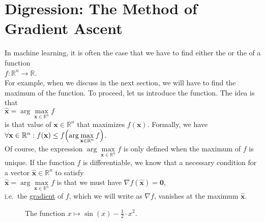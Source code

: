 \section{Digression: The Method of Gradient Ascent \label{section:gradient-ascent}}
In machine learning, it is often the case that we have to find either the  or the 
of a function 
\\[0.2cm]
\hspace*{1.3cm}
$f: \mathbb{R}^n \rightarrow \mathbb{R}$.
\\[0.2cm]
For example, when we discuss  in the next section, we will have to find the maximum
of the  function.  To proceed, let us introduce the \blue{$\arg\max$} function.
 The idea is that
\\[0.2cm]
\hspace*{1.3cm}
$\mathbf{\widehat{x}} = \arg\max\limits_{\mathbf{x}\in \mathbb{R}^n} f$
\\[0.2cm]
is that value of $\mathbf{x} \in \mathbb{R}^n$ that maximizes $ f(\mathbf{x})$.  Formally, we have
\\[0.2cm]
\hspace*{1.3cm}
$\forall \mathbf{x} \in \mathbb{R}^n : f(\mathbf{x}) \leq f\Bigl(\arg\max\limits_{\mathbf{x}\in \mathbb{R}^n} f\Bigr)$.
\\[0.2cm]
Of course, the expression $\arg\max\limits_{\mathbf{x}\in \mathbb{R}^n} f$ is only defined when the maximum of
$f$ is unique.  If the function $f$ is differentiable, we know that a necessary condition for a vector
$\mathbf{\widehat{x}} \in \mathbb{R}^n$ to satisfy
\\[0.2cm]
\hspace*{1.3cm}
$\mathbf{\widehat{x}} = \arg\max\limits_{\mathbf{x}\in \mathbb{R}^n} f$ \quad is that we must have \quad $\nabla f(\mathbf{\widehat{x}}) = \mathbf{0}$,
\\[0.2cm]
i.e.~the \href{https://en.wikipedia.org/wiki/Gradient}{gradient} of $f$, which we will write as $\nabla f$,
vanishes at the maximum $\mathbf{\widehat{x}}$.

\begin{figure}[!th]
\centering
\hspace*{-1.3cm}
\vspace*{-0.3cm}
\caption{The function $x \mapsto \sin(x) - \frac{1}{2} \cdot x^2$.}
\label{fig:sin-minus-square.pdf}
\end{figure}

